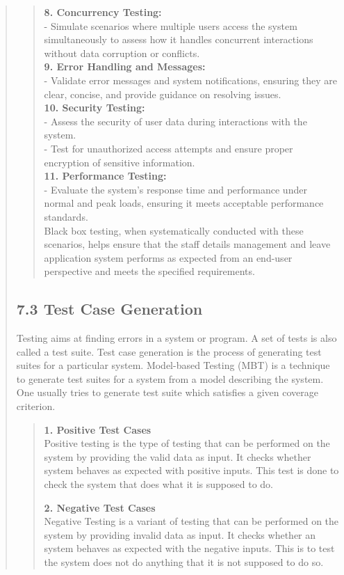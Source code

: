\documentclass[12pt]{report}
\begin{document}
\begin{quote}
\begin{quote}
			\textbf{8. Concurrency Testing:}\\
			- Simulate scenarios where multiple users access the system simultaneously to assess how it handles concurrent interactions without data corruption or conflicts.\\
			
			\textbf{9. Error Handling and Messages:}\\
			- Validate error messages and system notifications, ensuring they are clear, concise, and provide guidance on resolving issues.\\
			
			\textbf{10. Security Testing:}\\
			- Assess the security of user data during interactions with the system.\\
			- Test for unauthorized access attempts and ensure proper encryption of sensitive information.\\
			
			\textbf{11. Performance Testing:}\\
			- Evaluate the system's response time and performance under normal and peak loads, ensuring it meets acceptable performance standards.\\
			
			Black box testing, when systematically conducted with these scenarios, helps ensure that the staff details management and leave application system performs as expected from an end-user perspective and meets the specified requirements.
		\end{quote}
		
		\subsection{7.3 Test Case Generation}
		Testing aims at finding errors in a system or program. A set of tests is also called a test suite. Test case generation is the process of generating test suites for a particular system. Model-based Testing (MBT) is a technique to generate test suites for a system from a model describing the system. One usually tries to generate test suite which satisfies a given coverage criterion.
		\begin{quote}
			\textbf{1. Positive Test Cases} \\
			
			Positive testing is the type of testing that can be performed on the system by providing the valid data as input. It checks whether system behaves as expected with positive inputs. This test is done to check the system that does what it is supposed to do.
			
			\textbf{2. Negative Test Cases}\\
			
			Negative Testing is a variant of testing that can be performed on the system by providing invalid data as input. It checks whether an system behaves as expected with the negative inputs. This is to test the system does not do anything that it is not supposed to do so.
		\end{quote}
	\end{quote}
	\clearpage
	
\end{document}
